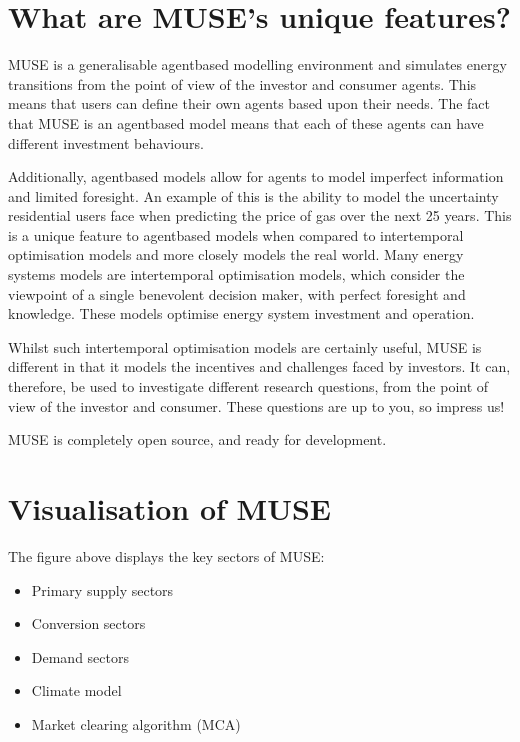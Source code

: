 \documentclass[letterpaper,10pt,english]{sphinxmanual}
\let\sphinxpxdimen\pdfpxdimen\else\newdimen\sphinxpxdimen
\begin{document}
\section{What are MUSE’s unique features?}
\label{\detokenize{overview:what-are-muse-s-unique-features}}
MUSE is a generalisable agent\sphinxhyphen{}based modelling environment and simulates energy transitions from the point of view of the investor and consumer agents. This means that users can define their own agents based upon their needs. The fact that MUSE is an agent\sphinxhyphen{}based model means that each of these agents can have different investment behaviours.

Additionally, agent\sphinxhyphen{}based models allow for agents to model imperfect information and limited foresight. An example of this is the ability to model the uncertainty residential users face when predicting the price of gas over the next 25 years. This is a unique feature to agent\sphinxhyphen{}based models when compared to intertemporal optimisation models and more closely models the real world. Many energy systems models are intertemporal optimisation models, which consider the viewpoint of a single benevolent decision maker, with perfect foresight and knowledge. These models optimise energy system investment and operation.

Whilst such intertemporal optimisation models are certainly useful, MUSE is different in that it models the incentives and challenges faced by investors. It can, therefore, be used to investigate different research questions, from the point of view of the investor and consumer. These questions are up to you, so impress us!

MUSE is completely open source, and ready for development.


\section{Visualisation of MUSE}
\label{\detokenize{overview:visualisation-of-muse}}
\noindent{\hspace*{\fill}\sphinxincludegraphics[width=550\sphinxpxdimen]{{muse_overview}.jpg}\hspace*{\fill}}

The figure above displays the key sectors of MUSE:
\begin{itemize}
\item {} 
Primary supply sectors

\item {} 
Conversion sectors

\item {} 
Demand sectors

\item {} 
Climate model

\item {} 
Market clearing algorithm (MCA)

\end{itemize}
\end{document}
